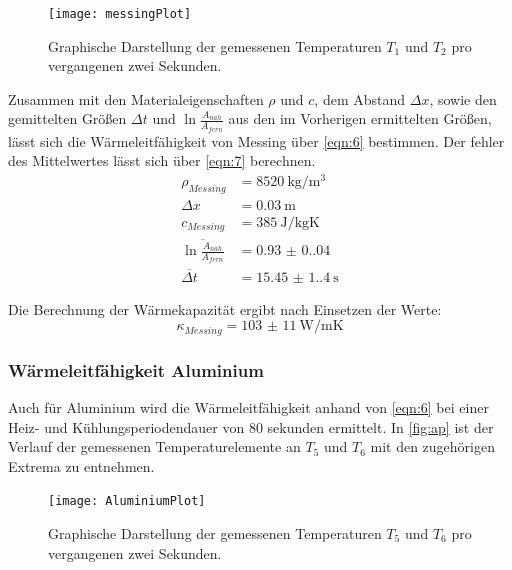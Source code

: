 \begin{figure}[H]
  \centering
  \caption{Graphische Darstellung der gemessenen Temperaturen $T_1$ und $T_2$ pro vergangenen zwei Sekunden.}
  \label{fig:mp}
  \texttt{[image: messingPlot]}
\end{figure}

\noindent Zusammen mit den Materialeigenschaften $\rho$ und $c$, dem Abstand 
$\Delta x$, sowie den gemittelten Größen $\Delta t $ und 
$ \ln{\frac{A_{nah}}{A_{fern}}}$ aus den im Vorherigen ermittelten Größen,
lässt sich die Wärmeleitfähigkeit von Messing über \autoref{eqn:6} bestimmen.
Der fehler des Mittelwertes lässt sich über \autoref{eqn:7} berechnen.
\begin{align*}
  \rho_{Messing}                                &= \qty{8520}{\kilo\gram\per\cubic\meter}\\
  \Delta x                              &= \qty{0.03}{\meter}\\
  c_{Messing}                                   &= \qty{385}{\joule\per\kilo\gram\kelvin}\\
  \overline{\ln{\frac{A_{nah}}{A_{fern}}}}  &= \qty{0.93(0.04)}{}\\
  \overline{\Delta t}                   &= \qty{15.45(1.4)}{\second}
\end{align*}

\noindent Die Berechnung der Wärmekapazität ergibt nach Einsetzen der Werte:
\begin{equation}
  \kappa_{Messing} = \qty{103(11)}{\watt\per\meter\kelvin}
\end{equation}

\subsubsection{Wärmeleitfähigkeit Aluminium}
Auch für Aluminium wird die Wärmeleitfähigkeit anhand von \autoref{eqn:6} bei
einer Heiz- und Kühlungsperiodendauer von 80 sekunden ermittelt. In 
\autoref{fig:ap} ist der Verlauf der gemessenen Temperaturelemente an $T_5$ 
und $T_6$ mit den zugehörigen Extrema zu entnehmen.
\begin{figure}[H]
  \centering
  \caption{Graphische Darstellung der gemessenen Temperaturen $T_5$ und $T_6$ pro vergangenen zwei Sekunden.}
  \label{fig:ap}
  \texttt{[image: AluminiumPlot]}
\end{figure}

